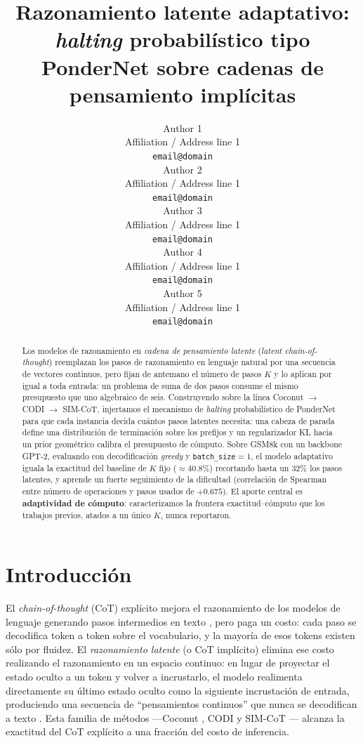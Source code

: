 \documentclass[11pt]{article}
\title{Razonamiento latente adaptativo: \textit{halting} probabilístico tipo PonderNet sobre cadenas de pensamiento implícitas}
\author{Author 1 \\
  Affiliation / Address line 1 \\
  \texttt{email@domain} \\\And
  Author 2 \\
  Affiliation / Address line 1 \\
  \texttt{email@domain} \\\And
  Author 3 \\
  Affiliation / Address line 1 \\
  \texttt{email@domain} \\\AND
  Author 4 \\
  Affiliation / Address line 1 \\
  \texttt{email@domain} \\\And
  Author 5 \\
  Affiliation / Address line 1 \\
  \texttt{email@domain} \\}
\begin{document}
\maketitle

\begin{abstract}
Los modelos de razonamiento en \emph{cadena de pensamiento latente} (\textit{latent chain-of-thought}) reemplazan los pasos de razonamiento en lenguaje natural por una secuencia de vectores continuos, pero fijan de antemano el número de pasos $K$ y lo aplican por igual a toda entrada: un problema de suma de dos pasos consume el mismo presupuesto que uno algebraico de seis. Construyendo sobre la línea Coconut $\rightarrow$ CODI $\rightarrow$ SIM-CoT, injertamos el mecanismo de \textit{halting} probabilístico de PonderNet para que cada instancia decida cuántos pasos latentes necesita: una cabeza de parada define una distribución de terminación sobre los prefijos y un regularizador KL hacia un prior geométrico calibra el presupuesto de cómputo. Sobre GSM8k con un backbone GPT-2, evaluando con decodificación \textit{greedy} y \texttt{batch\_size}$=1$, el modelo adaptativo iguala la exactitud del baseline de $K$ fijo ($\approx 40.8\%$) recortando hasta un $32\%$ los pasos latentes, y aprende un fuerte seguimiento de la dificultad (correlación de Spearman entre número de operaciones y pasos usados de $+0.675$). El aporte central es \textbf{adaptividad de cómputo}: caracterizamos la frontera exactitud--cómputo que los trabajos previos, atados a un único $K$, nunca reportaron.
\end{abstract}

\section{Introducción}

El \emph{chain-of-thought} (CoT) explícito mejora el razonamiento de los modelos de lenguaje generando pasos intermedios en texto \citep{wei2022cot}, pero paga un costo: cada paso se decodifica token a token sobre el vocabulario, y la mayoría de esos tokens existen sólo por fluidez. El \emph{razonamiento latente} (o CoT implícito) elimina ese costo realizando el razonamiento en un espacio continuo: en lugar de proyectar el estado oculto a un token y volver a incrustarlo, el modelo realimenta directamente su último estado oculto como la siguiente incrustación de entrada, produciendo una secuencia de ``pensamientos continuos'' que nunca se decodifican a texto \citep{hao2024coconut}. Esta familia de métodos ---Coconut \citep{hao2024coconut}, CODI \citep{shen2025codi} y SIM-CoT \citep{wei2025simcot}--- alcanza la exactitud del CoT explícito a una fracción del costo de inferencia.
\end{document}
